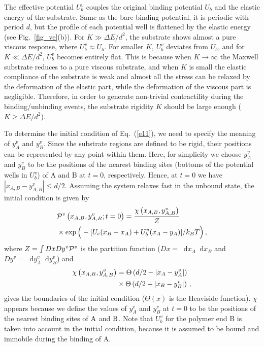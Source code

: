 \documentclass[twocolumn,prl,english]{revtex4-1}
\newcommand*\diff{\mathop{}\!\mathrm{d}}
\begin{document}
The effective potential $U_b^v$ couples the original binding potential $U_b$ and the elastic energy of the substrate. Same as the bare binding potential, it is periodic with period $d$, but the profile of each potential well is flattened by the elastic energy (see Fig.~\ref{fig_ve}(b)). For $K\gg \Delta E/d^2$, the substrate shows almost a pure viscous response, where $U_b^v\approx U_b$. For smaller $K$, $U_b^v$ deviates from $U_b$, and for $K\ll \Delta E/d^2$, $U_b^v$ becomes entirely flat. This is because when $K\to\infty$ the Maxwell substrate reduces to a pure viscous substrate, and  when $K$ is small the elastic compliance of the substrate is weak and almost all the stress can be relaxed by the deformation of the elastic part, while the deformation of the viscous part is negligible.   Therefore, in order to generate non-trivial contractility during the binding/unbinding events, the substrate rigidity $K$ should be large enough ($K\geq \Delta E/d^2$). 


To determine the initial condition of Eq.~(\ref{e11}), we need to specify the meaning of $y_A^v$ and $y_B^v$. Since the substrate regions are defined to be rigid, their positions can be represented by any point within them. Here, for simplicity we choose $y_A^v$ and $y_B^v$ to be the positions of the nearest binding sites (bottoms of the potential wells in $U_b^v$) of A and B at $t=0$, respectively. Hence, at $t=0$ we have $|x_{A,B}-y_{A,B}^v|\leq d/2$. Assuming the system relaxes fast in the unbound state, the initial condition is given by
\begin{align}
&{\cal P}^v\left(x_{A,B}, y_{A,B}^v;t=0\right)=\frac{\chi\left(x_{A,B}, y_{A,B}^v\right)}{ Z}\notag\\&\times\exp{\Big(- [U_e(x_B-x_A)+U_b^v(x_A-y_A)]/k_B T\Big)}\,,\label{e4}
\end{align}
where $Z = \int DxDy^v {\cal P}^v$ is the partition function ($Dx = \diff x_A \diff x_B$ and $Dy^v = \diff y_A^v \diff y_B^v$) and 
\begin{align}
\chi\left(x_{A,B}, y_{A,B}^v\right)&= \Theta\left(d/2 - \left|x_A - y_A^v\right|\right)\notag\\&\times\Theta\left(d/2 - \left|x_B - y_B^v\right|\right)\,,\label{e5}
\end{align}
gives the  boundaries of the initial condition ($\Theta(x)$ is the Heaviside function). $\chi$ appears because we define the values of $y_A^v$ and $y_B^v$ at $t=0$ to be the positions of the nearest binding sites of $\rm A$ and $\rm B$. Note that $U_b^v$ for the polymer end B is taken into account in the initial condition, because it is assumed to be bound and immobile during the binding of A. 
\end{document}
